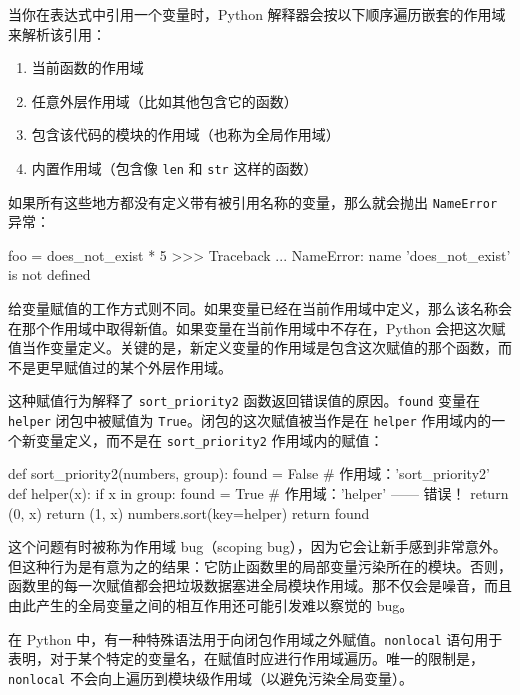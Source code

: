 当你在表达式中引用一个变量时，Python 解释器会按以下顺序遍历嵌套的作用域来解析该引用：

\begin{enumerate}
\item 当前函数的作用域
\item 任意外层作用域（比如其他包含它的函数）
\item 包含该代码的模块的作用域（也称为全局作用域）
\item 内置作用域（包含像 \texttt{len} 和 \texttt{str} 这样的函数）
\end{enumerate}

如果所有这些地方都没有定义带有被引用名称的变量，那么就会抛出 \texttt{NameError} 异常：

\begin{codebox}[python]
foo = does_not_exist * 5
>>>
Traceback ...
NameError: name 'does_not_exist' is not defined
\end{codebox}

给变量赋值的工作方式则不同。如果变量已经在当前作用域中定义，那么该名称会在那个作用域中取得新值。如果变量在当前作用域中不存在，Python 会把这次赋值当作变量定义。关键的是，新定义变量的作用域是包含这次赋值的那个函数，而不是更早赋值过的某个外层作用域。

这种赋值行为解释了 \texttt{sort\_priority2} 函数返回错误值的原因。\texttt{found} 变量在 \texttt{helper} 闭包中被赋值为 \texttt{True}。闭包的这次赋值被当作是在 \texttt{helper} 作用域内的一个新变量定义，而不是在 \texttt{sort\_priority2} 作用域内的赋值：

\begin{codebox}[python]
def sort_priority2(numbers, group):
    found = False          # 作用域：'sort_priority2'
    def helper(x):
        if x in group:
            found = True   # 作用域：'helper' —— 错误！
            return (0, x)
        return (1, x)
    numbers.sort(key=helper)
    return found
\end{codebox}

这个问题有时被称为作用域 bug（scoping bug），因为它会让新手感到非常意外。但这种行为是有意为之的结果：它防止函数里的局部变量污染所在的模块。否则，函数里的每一次赋值都会把垃圾数据塞进全局模块作用域。那不仅会是噪音，而且由此产生的全局变量之间的相互作用还可能引发难以察觉的 bug。

在 Python 中，有一种特殊语法用于向闭包作用域之外赋值。\texttt{nonlocal} 语句用于表明，对于某个特定的变量名，在赋值时应进行作用域遍历。唯一的限制是，\texttt{nonlocal} 不会向上遍历到模块级作用域（以避免污染全局变量）。

